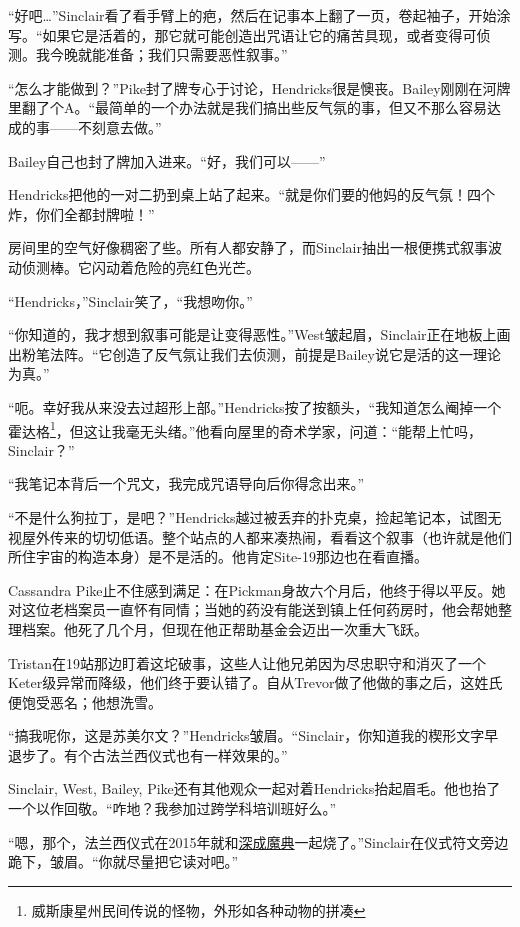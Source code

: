 “好吧…”Sinclair看了看手臂上的疤，然后在记事本上翻了一页，卷起袖子，开始涂写。“如果它是活着的，那它就可能创造出咒语让它的痛苦具现，或者变得可侦测。我今晚就能准备；我们只需要恶性叙事。”

“怎么才能做到？”Pike封了牌专心于讨论，Hendricks很是懊丧。Bailey刚刚在河牌里翻了个A。“最简单的一个办法就是我们搞出些反气氛的事，但又不那么容易达成的事——不刻意去做。”

Bailey自己也封了牌加入进来。“好，我们可以——”

Hendricks把他的一对二扔到桌上站了起来。“就是你们要的他妈的反气氛！四个炸，你们全都封牌啦！”

房间里的空气好像稠密了些。所有人都安静了，而Sinclair抽出一根便携式叙事波动侦测棒。它闪动着危险的亮红色光芒。

“Hendricks，”Sinclair笑了，“我想吻你。”

\hr

“你知道的，我才想到叙事可能是让变得恶性。”West皱起眉，Sinclair正在地板上画出粉笔法阵。“它创造了反气氛让我们去侦测，前提是Bailey说它是活的这一理论为真。”

“呃。幸好我从来没去过超形上部。”Hendricks按了按额头，“我知道怎么阉掉一个霍达格\footnote{威斯康星州民间传说的怪物，外形如各种动物的拼凑}，但这让我毫无头绪。”他看向屋里的奇术学家，问道：“能帮上忙吗，Sinclair？”

“我笔记本背后一个咒文，我完成咒语导向后你得念出来。”

“不是什么狗拉丁，是吧？”Hendricks越过被丢弃的扑克桌，捡起笔记本，试图无视屋外传来的切切低语。整个站点的人都来凑热闹，看看这个叙事（也许就是他们所住宇宙的构造本身）是不是活的。他肯定Site-19那边也在看直播。

Cassandra Pike止不住感到满足：在Pickman身故六个月后，他终于得以平反。她对这位老档案员一直怀有同情；当她的药没有能送到镇上任何药房时，他会帮她整理档案。他死了几个月，但现在他正帮助基金会迈出一次重大飞跃。

Tristan在19站那边盯着这坨破事，这些人让他兄弟因为尽忠职守和消灭了一个Keter级异常而降级，他们终于要认错了。自从Trevor做了他做的事之后，这姓氏便饱受恶名；他想洗雪。

“搞我呢你，这是苏美尔文？”Hendricks皱眉。“Sinclair，你知道我的楔形文字早退步了。有个古法兰西仪式也有一样效果的。”

Sinclair, West, Bailey, Pike还有其他观众一起对着Hendricks抬起眉毛。他也抬了一个以作回敬。“咋地？我参加过跨学科培训班好么。”

“嗯，那个，法兰西仪式在2015年就和\hyperref[chap:]{深成魔典}一起烧了。”Sinclair在仪式符文旁边跪下，皱眉。“你就尽量把它读对吧。”

